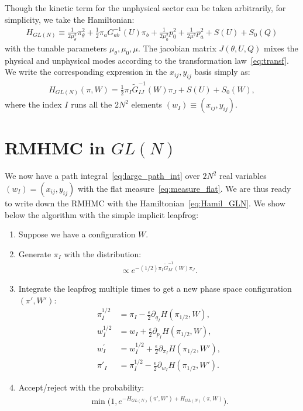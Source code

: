 \documentclass[12pt]{article}
\begin{document}
Though the kinetic term for the unphysical sector
can be taken arbitrarily,
for simplicity, we take the Hamiltonian:
\begin{align}
  H_{GL(N)}
  \equiv
  \frac{1}{2 \mu_\theta^2}
  \pi_\theta^2
  +
  \frac{1}{2}
  \pi_a G^{-1}_{ab} (U) \pi_b
  +
  \frac{1}{2 \mu_0^2}
  p_0^2
  +
  \frac{1}{2 \mu^2}
  p_a^2
  +
  S(U)
  +
  S_0(Q)
\end{align}
with the tunable parameters $\mu_\theta, \mu_0, \mu$.
The jacobian matrix $J(\theta, U, Q)$ mixes the
physical and unphysical modes according to
the transformation law~\eqref{eq:transf}.
We write the corresponding expression in the $x_{ij}, y_{ij}$
basis simply as:
\begin{align}
  H_{GL(N)}
  (\pi, W)
  =
  \frac{1}{2} \pi_I \tilde{G}_{IJ}^{-1}(W) \pi_J + S(U) + S_0(W),
  \label{eq:Hamil_GLN}
\end{align}
where the index $I$ runs all the $2N^2$ elements
$(w_I) \equiv ( x_{ij}, y_{ij} )$.


\section{RMHMC in $GL(N)$}
\label{sec:rmhmc_gln}

We now have
a path integral~\eqref{eq:large_path_int}
over $2N^2$ real variables
$(w_I) = (x_{ij}, y_{ij})$
with the flat measure~\eqref{eq:measure_flat}.
We are thus ready to write down the
RMHMC with the Hamiltonian~\eqref{eq:Hamil_GLN}.
We show below the algorithm with the simple implicit leapfrog:
\begin{enumerate}
\item Suppose we have a configuration $W$.
\item Generate $\pi_I$
  with the distribution:
  \begin{align}
    \propto e^{-(1/2) \pi_I \tilde G_{IJ}^{-1}(W) \pi_J}.
  \end{align}
\item
  Integrate the leapfrog
  multiple times to get a new phase space configuration $(\pi',W')$:
  \begin{align}
    \pi_I^{1/2}
    &=
      \pi_I
      -
      \frac{\epsilon}{2}
      \partial_{q_I} H(\pi_{1/2}, W)
      ,
      \label{eq:p_half}
    \\
    w_I^{1/2}
    &=
      w_I
      +
      \frac{\epsilon}{2}
      \partial_{p_I} H(\pi_{1/2}, W)
      ,
      \label{eq:q_half}
    \\
    w_I^{\prime}
    &=
      w_I^{1/2}
      +
      \frac{\epsilon}{2}
      \partial_{\pi_I} H(\pi_{1/2}, W')
      ,
      \label{eq:q_prime}
    \\
    \pi'_I
    &= \pi_I^{1/2}
      -
      \frac{\epsilon}{2}
      \partial_{w_I} H(\pi_{1/2}, W').
      \label{eq:p_prime}
  \end{align}
\item Accept/reject with the probability:
  \begin{align}
    \min \Big(
    1, e^{-H_{GL(N)}(\pi',W') + H_{GL(N)}(\pi, W)}
    \Big).
  \end{align}
\end{enumerate}
\end{document}
